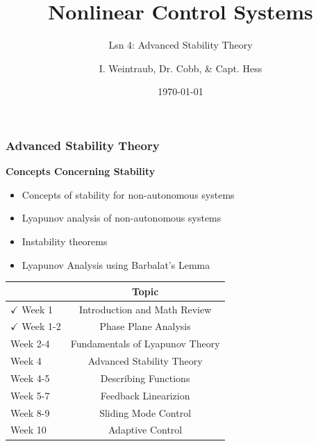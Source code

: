 \documentclass[11pt,handout]{beamer}   %
\title[Your Short Title]{Nonlinear Control Systems}
\subtitle{Lsn 4: Advanced Stability Theory}
\author{I. Weintraub, Dr. Cobb, \& Capt. Hess}
\institute{Air Force Institute of Technology}
\date{\today}
\begin{document}
\begin{frame}
  \titlepage
\end{frame}


\begin{frame}
\frametitle{Advanced Stability Theory}
\textbf{Concepts Concerning Stability}
\begin{itemize}
\item Concepts of stability for non-autonomous systems
\item Lyapunov analysis of non-autonomous systems
\item Instability theorems
\item Lyapunov Analysis using Barbalat's Lemma
\end{itemize}

\begin{table}
\centering
    \begin{tabular}{l  c}
    \hline
     & Topic \\ \hline
    $\checkmark$ Week 1 & Introduction and Math Review\\
    $\checkmark$ Week 1-2 & Phase Plane Analysis\\
    Week 2-4 & Fundamentals of Lyapunov Theory\\
    Week 4   & Advanced Stability Theory\\
    Week 4-5 & Describing Functions \\
    Week 5-7 & Feedback Linearizion \\ 
    Week 8-9 & Sliding Mode Control \\
    Week 10  & Adaptive Control \\\hline
    \end{tabular}
\end{table}

\end{frame}
\end{document}
